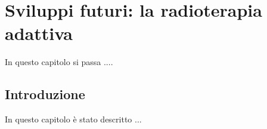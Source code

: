 \chapter{Sviluppi futuri: la radioterapia adattiva}
\minitoc
\textsf{In questo capitolo si passa ....}



\section{Introduzione}
In questo capitolo è stato descritto ... 












